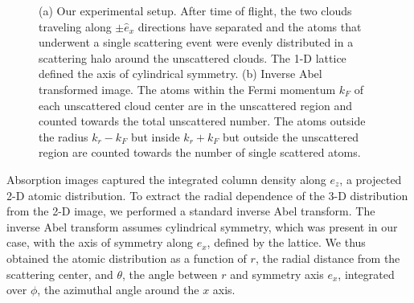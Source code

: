 \documentclass[12pt]{iopart}
\begin{document}
\begin{figure}
\caption{(a) Our experimental setup. After time of flight, the two clouds traveling along $\pm \hat{e}_x$ directions have separated and the atoms that underwent a single scattering event were evenly distributed in a scattering halo around the unscattered clouds. The 1-D lattice defined the axis of cylindrical symmetry. (b) Inverse Abel transformed image. The atoms within the Fermi momentum $k_F$ of each unscattered cloud center are in the unscattered region and counted towards the total unscattered number. The atoms outside the radius $k_r-k_F$ but inside $k_r+k_F$ but outside the unscattered region are counted towards the number of single scattered atoms.   }  
\label{fig:halo}
\end{figure}
\par Absorption images captured the integrated column density along $e_z$, a projected 2-D atomic distribution. To extract the radial dependence of the 3-D distribution from the 2-D image, we performed a standard inverse Abel transform. The inverse Abel transform assumes cylindrical symmetry, which was present in our case, with the axis of symmetry along $e_x$, defined by the lattice. We thus obtained the atomic distribution as a function of $r$, the radial distance from the scattering center, and $\theta$, the angle between $r$ and symmetry axis $e_x$, integrated over $\phi$, the azimuthal angle around the $x$ axis. 
\end{document}
